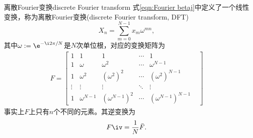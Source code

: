 \begin{definition}
    {离散Fourier变换}{discrete Fourier transform}
    式\eqref{eqn:Fourier betaj}中定义了一个线性变换，称为离散Fourier变换(discrete Fourier transform, DFT)
    \[
        X_n=\sum_{m=0}^{N-1}x_m\omega^{mn},
    \]
    其中$\omega:=\e^{-\i2\pi/N}$是$N$次单位根，对应的变换矩阵为
    \begin{eqnarray}
        F=\begin{bmatrix}
            1&1&1&\cdots&1\\
            1&\omega&\omega^2&\cdots&\omega^{N-1}\\
            1&\omega^2&(\omega^2)^2&\cdots&(\omega^2)^{N-1}\\
            \vdots&\vdots&\vdots&\ddots&\vdots&\\
            1&\omega^{N-1}&(\omega^{N-1})^2&\cdots&(\omega^{N-1})^{N-1}
        \end{bmatrix}
    \end{eqnarray}
    事实上$F$上只有$n$个不同的元素。其逆变换为
    \begin{equation}
        F\iv=\frac1N\bar F.
    \end{equation}
\end{definition}

